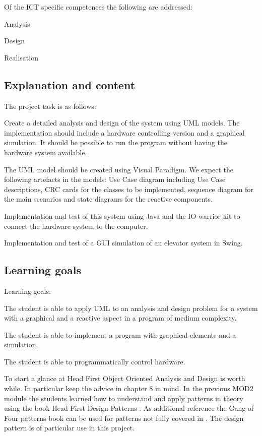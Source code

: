 Of the ICT specific competences the following are addressed:
\begin{Itemize}
\item Analysis
\item Design
\item Realisation
\end{Itemize}


\subsection{Explanation and  content}
The project task is as follows:
\begin{Enumerate}
\item Create a detailed analysis and design of the system using
  UML models. The implementation should include a hardware controlling version
  and a graphical simulation. It should be possible to run the program
  without having the hardware system available.
\item The UML model should be created using Visual Paradigm. We
  expect the following artefacts in the models: Use Case diagram
  including Use Case descriptions, CRC cards for the classes to be
  implemented, sequence diagram for the main scenarios and state
  diagrams for the reactive components.
\item Implementation and test of this system using Java and the
  IO-warrior kit to connect the hardware system to the computer.
\item Implementation and test of a GUI simulation of an elevator
  system in Swing.
\end{Enumerate}


\subsection{Learning goals}
Learning goals:

The student is able to apply UML to an analysis and design problem for
a  system with a graphical and a reactive aspect in a program of
medium complexity.

The student is able to implement a program with graphical elements and
a simulation.

The student is able to programmatically control hardware. 

To start a glance at Head First Object Oriented Analysis and Design
\citep{mclaughlin:2006:ooad} is worth while. In particular keep the advice in chapter
8 in mind.
In the previous MOD2 module the students learned how to understand and
apply patterns in theory using the book Head First Design Patterns \citep{freeman:2004:designpatterns}.
As additional reference the Gang of Four patterns book \citep{gamma:1995:patterns} can
be used for patterns not fully covered in
\citep{freeman:2004:designpatterns}. The design pattern 
is of particular use in this project.

